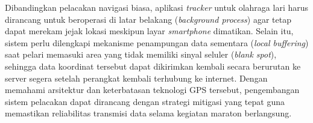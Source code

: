 Dibandingkan pelacakan navigasi biasa, aplikasi \textit{tracker} untuk olahraga lari harus dirancang untuk beroperasi di latar belakang (\textit{background process}) agar tetap dapat merekam jejak lokasi meskipun layar \textit{smartphone} dimatikan. Selain itu, sistem perlu dilengkapi mekanisme penampungan data sementara (\textit{local buffering}) saat pelari memasuki area yang tidak memiliki sinyal seluler (\textit{blank spot}), sehingga data koordinat tersebut dapat dikirimkan kembali secara berurutan ke server segera setelah perangkat kembali terhubung ke internet. Dengan memahami arsitektur dan keterbatasan teknologi GPS tersebut, pengembangan sistem pelacakan dapat dirancang dengan strategi mitigasi yang tepat guna memastikan reliabilitas transmisi data selama kegiatan maraton berlangsung.
